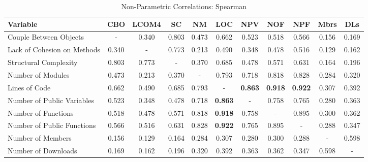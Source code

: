 \documentclass[conference]{IEEEtran}
\begin{document}
\begin{center}
\begin{table}[bt]
\centering \caption{Non-Parametric Correlations: Spearman}
\begin{tabular}{|l|c|c|c|c|c|c|c|c|c|c|} \hline

\textbf{Variable}             & CBO & LCOM4 & SC & NM & LOC & NPV & NOF & NPF & Mbrs & DLs
\\ \hline
Couple Between Objects        & - & 0.340 & 0.803 & 0.473 & 0.662 & 0.523 & 0.518 & 0.566 & 0.156 & 0.169
\\ \hline
Lack of Cohesion on Methods   & 0.340 & - & 0.773 & 0.213 & 0.490 & 0.348 & 0.478 & 0.516 & 0.129 & 0.162
\\ \hline
Structural Complexity         & 0.803 & 0.773 & - & 0.370 & 0.685 & 0.478 & 0.571 & 0.631 & 0.164 & 0.196
\\ \hline
Number of Modules             & 0.473 & 0.213 & 0.370 & - & 0.793 & 0.718 & 0.818 & 0.828 & 0.284 & 0.320
\\ \hline
Lines of Code                 & 0.662 & 0.490 & 0.685 & 0.793 & - & \textbf{0.863} & \textbf{0.918} & \textbf{0.922} & 0.307 & 0.392
\\ \hline
Number of Public Variables    & 0.523 & 0.348 & 0.478 & 0.718 & \textbf{0.863} & - & 0.758 & 0.765 & 0.280 & 0.363
\\ \hline
Number of Functions           & 0.518 & 0.478 & 0.571 & 0.818 & \textbf{0.918} & 0.758 & - & 0.895 & 0.300 & 0.362
\\ \hline
Number of Public Functions    & 0.566 & 0.516 & 0.631 & 0.828 & \textbf{0.922} & 0.765 & 0.895 & - & 0.288 & 0.347
\\ \hline
Number of Members             & 0.156 & 0.129 & 0.164 & 0.284 & 0.307 & 0.280 & 0.300 & 0.288 & - & 0.598
\\ \hline
Number of Downloads           & 0.169 & 0.162 & 0.196 & 0.320 & 0.392 & 0.363 & 0.362 & 0.347 & 0.598 & -
\\ \hline
\end{tabular}
\label{spearman}
\end{table}
\end{center}
\end{document}
